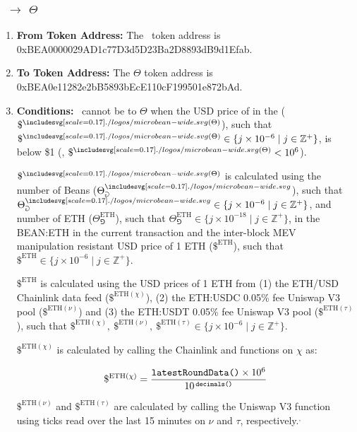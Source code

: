 \documentclass[class=article, crop=false]{standalone}
\begin{document}
\subsubsection{\Bean\ $\rightarrow$ $\Theta$}
    \begin{enumerate}
        \item \textbf{From Token Address:} The \Bean\ token address is 0xBEA0000029AD1c77D3d5D23Ba2D8893dB9d1Efab.
        \item \textbf{To Token Address:} The $\Theta$ token address is 0xBEA0e11282e2bB5893bEcE110cF199501e872bAd.        
        \item \textbf{Conditions:}  \Bean\ cannot be  to  $\Theta$ when the USD price of  in the  ($\$^{\bean(\Theta)}$), such that $\$^{\bean(\Theta)}\in \{j \times 10^{-6} \mid j \in \mathbb{Z}^{+} \}$, is below \$1 (, $\$^{\bean(\Theta)} < 10^6$). 

        $\$^{\bean(\Theta)}$ is calculated using the number of Beans ($\Theta_{\Game}^{\bean}$), such that $\Theta_{\Game}^{\bean} \in \{j \times 10^{-6} \mid j \in \mathbb{Z}^{+} \}$, and number of ETH ($\Theta_{\Game}^{\text{ETH}}$), such that $\Theta_{\Game}^{\text{ETH}} \in \{j \times 10^{-18} \mid j \in \mathbb{Z}^{+} \}$, in the BEAN:ETH  in the current transaction and the inter-block MEV manipulation resistant USD price of 1 ETH ($\$^{\text{ETH}}$), such that $\$^{\text{ETH}} \in \{j \times 10^{-6} \mid j \in \mathbb{Z}^{+} \}$.

        $\$^{\text{ETH}}$ is calculated using the USD prices of 1 ETH from (1) the ETH/USD Chainlink data feed ($\$^{\text{ETH}(\chi)}$), (2) the ETH:USDC 0.05\% fee Uniswap V3 pool ($\$^{\text{ETH}(\nu)}$) and (3) the ETH:USDT 0.05\% fee Uniswap V3 pool ($\$^{\text{ETH}(\tau)}$), such that $\$^{\text{ETH}(\chi)},\ \$^{\text{ETH}(\nu)},\ \$^{\text{ETH}(\tau)} \in \{j \times 10^{-6} \mid j \in \mathbb{Z}^{+} \}$.

        $\$^{\text{ETH}(\chi)}$ is calculated by calling the Chainlink  and  functions on $\chi$ as:

        $$ \$^{\text{ETH}(\chi)} = \frac{\texttt{latestRoundData()} \times 10^6}{10^{\mkern3mu \texttt{decimals()}}} $$

        $\$^{\text{ETH}(\nu)}$ and $\$^{\text{ETH}(\tau)}$ are calculated by calling the Uniswap V3  function using ticks read over the last 15 minutes on $\nu$ and $\tau$, respectively.$^{,}$


\end{enumerate}
\end{document}
